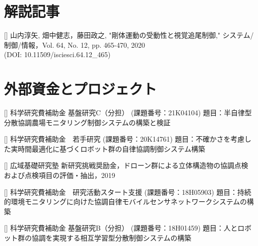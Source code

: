 \documentclass[letterpaper]{article}
\newcounter{tutorial}
\newcounter{fund}
\begin{document}
\section*{解説記事}

[] 
  山内淳矢, 畑中健志，藤田政之, 
  "剛体運動の受動性と視覚追尾制御," 
  システム/制御/情報，Vol. 64, No. 12, pp. 465-470, 2020 \\
  (DOI: 10.11509/isciesci.64.12\_465) \\
\addtocounter{tutorial}{-1}


\section*{外部資金とプロジェクト}

[] 
  科学研究費補助金 基盤研究C（分担） (課題番号：21K04104) 
  題目：半自律型分散協調農場モニタリング制御システムの構築と検証 \\
\addtocounter{fund}{-1}

[]  
  科学研究費補助金　若手研究 (課題番号：20K14761) 
  題目：不確かさを考慮した実時間最適化に基づくロボット群の自律協調制御システム構築 \\
\addtocounter{fund}{-1}

[]  
  広域基礎研究塾 新研究挑戦奨励金，ドローン群による立体構造物の協調点検および点検項目の評価・抽出，2019 \\
\addtocounter{fund}{-1}

[]  
  科学研究費補助金　研究活動スタート支援 (課題番号：18H05903)
  題目：持続的環境モニタリングに向けた協調自律モバイルセンサネットワークシステムの構築 \\
\addtocounter{fund}{-1}

[] 
  科学研究費補助金 基盤研究B（分担） (課題番号：18H01459)
  題目：人とロボット群の協調を実現する相互学習型分散制御システムの構築 \\
\addtocounter{fund}{-1}


\end{document}
